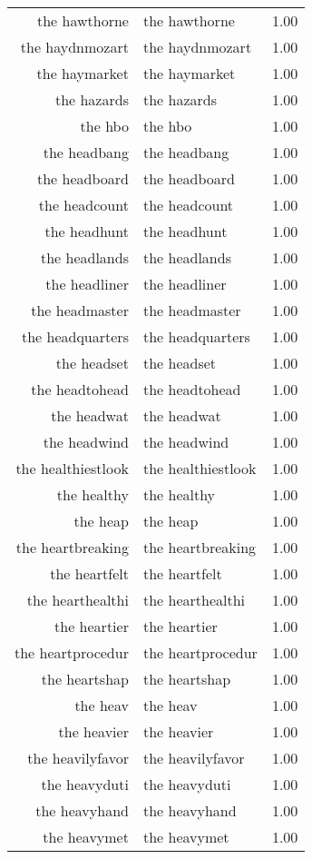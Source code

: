 \begin{table}[ht]
\begin{tabular}{rlr}
  the hawthorne & the hawthorne & 1.00 \\ 
  the haydnmozart & the haydnmozart & 1.00 \\ 
  the haymarket & the haymarket & 1.00 \\ 
  the hazards & the hazards & 1.00 \\ 
  the hbo & the hbo & 1.00 \\ 
  the headbang & the headbang & 1.00 \\ 
  the headboard & the headboard & 1.00 \\ 
  the headcount & the headcount & 1.00 \\ 
  the headhunt & the headhunt & 1.00 \\ 
  the headlands & the headlands & 1.00 \\ 
  the headliner & the headliner & 1.00 \\ 
  the headmaster & the headmaster & 1.00 \\ 
  the headquarters & the headquarters & 1.00 \\ 
  the headset & the headset & 1.00 \\ 
  the headtohead & the headtohead & 1.00 \\ 
  the headwat & the headwat & 1.00 \\ 
  the headwind & the headwind & 1.00 \\ 
  the healthiestlook & the healthiestlook & 1.00 \\ 
  the healthy & the healthy & 1.00 \\ 
  the heap & the heap & 1.00 \\ 
  the heartbreaking & the heartbreaking & 1.00 \\ 
  the heartfelt & the heartfelt & 1.00 \\ 
  the hearthealthi & the hearthealthi & 1.00 \\ 
  the heartier & the heartier & 1.00 \\ 
  the heartprocedur & the heartprocedur & 1.00 \\ 
  the heartshap & the heartshap & 1.00 \\ 
  the heav & the heav & 1.00 \\ 
  the heavier & the heavier & 1.00 \\ 
  the heavilyfavor & the heavilyfavor & 1.00 \\ 
  the heavyduti & the heavyduti & 1.00 \\ 
  the heavyhand & the heavyhand & 1.00 \\ 
  the heavymet & the heavymet & 1.00 \\ 

\end{tabular}
\end{table}
